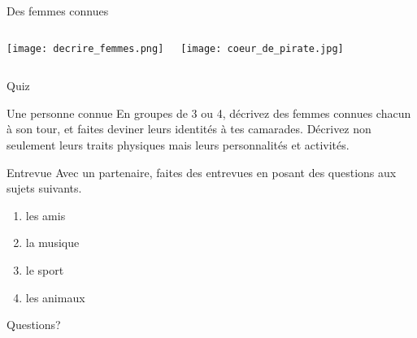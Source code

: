 \documentclass{beamer}
\begin{document}
  \begin{frame}{Des femmes connues}
    \begin{columns}
        \texttt{[image: decrire\_femmes.png]}
        \begin{minipage}[t][0.6\textheight]{\linewidth}
          \texttt{[image: coeur\_de\_pirate.jpg]}
        \end{minipage}
    \end{columns}
  \end{frame}

  \begin{frame}{}
    \begin{center}
      \Large Quiz
    \end{center}
  \end{frame}

  \begin{frame}{Une personne connue}
    En groupes de 3 ou 4, décrivez des femmes connues chacun à son tour, et faites deviner leurs identités à tes camarades. Décrivez non seulement leurs traits physiques mais leurs personnalités et activités. \\
  \end{frame}

  \begin{frame}{Entrevue}
    Avec un partenaire, faites des entrevues en posant des questions aux sujets suivants.  \\
    \begin{enumerate}
      \item les amis
      \item la musique
      \item le sport
      \item les animaux
    \end{enumerate}
  \end{frame}

  \begin{frame}{}
    \begin{center}
      \Large Questions?
    \end{center}
  \end{frame}
\end{document}
